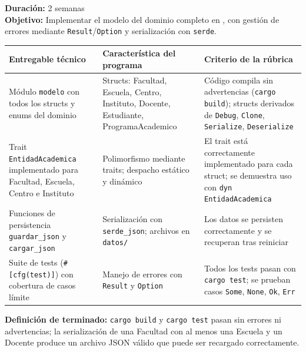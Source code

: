 \begin{tcolorbox}[sprintBox, title={Sprint 8 — Modelado del dominio en \rust}]
\textbf{Duración:} 2 semanas\\[4pt]
\textbf{Objetivo:} Implementar el modelo del dominio completo en \rust,
con gestión de errores mediante \texttt{Result}/\texttt{Option} y
serialización con \texttt{serde}.

\vspace{6pt}
\begin{tabularx}{\linewidth}{@{}L{4cm}L{4cm}L{4.5cm}@{}}
\toprule
\textbf{Entregable técnico} & \textbf{Característica del programa} & \textbf{Criterio de la rúbrica} \\
\midrule
Módulo \texttt{modelo} con todos los structs y enums del dominio &
  Structs: Facultad, Escuela, Centro, Instituto, Docente, Estudiante, ProgramaAcademico &
  Código compila sin advertencias (\texttt{cargo build}); structs derivados de \texttt{Debug}, \texttt{Clone}, \texttt{Serialize}, \texttt{Deserialize} \\
\addlinespace
Trait \texttt{EntidadAcademica} implementado para Facultad, Escuela, Centro e Instituto &
  Polimorfismo mediante traits; despacho estático y dinámico &
  El trait está correctamente implementado para cada struct; se demuestra uso con \texttt{dyn EntidadAcademica} \\
\addlinespace
Funciones de persistencia \texttt{guardar\_json} y \texttt{cargar\_json} &
  Serialización con \texttt{serde\_json}; archivos en \texttt{datos/} &
  Los datos se persisten correctamente y se recuperan tras reiniciar \\
\addlinespace
Suite de tests (\texttt{\#[cfg(test)]}) con cobertura de casos límite &
  Manejo de errores con \texttt{Result} y \texttt{Option} &
  Todos los tests pasan con \texttt{cargo test}; se prueban casos \texttt{Some}, \texttt{None}, \texttt{Ok}, \texttt{Err} \\
\bottomrule
\end{tabularx}

\vspace{8pt}
\textbf{Definición de terminado:} \texttt{cargo build} y \texttt{cargo test} pasan sin
errores ni advertencias; la serialización de una Facultad con al menos una Escuela y
un Docente produce un archivo JSON válido que puede ser recargado correctamente.
\end{tcolorbox}

\vspace{10pt}

